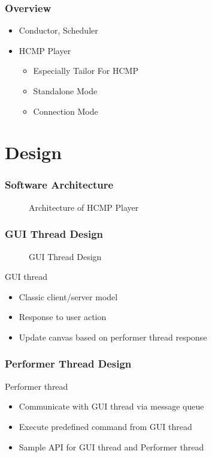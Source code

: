 \documentclass[t]{beamer}
\begin{document}
\begin{frame}
\frametitle{Overview}

  \begin{itemize}
    \item Conductor, Scheduler 
    \item HCMP Player 
        \begin{itemize}
          \item Especially Tailor For HCMP 
          \item Standalone Mode
          \item Connection Mode 
        \end{itemize}
  \end{itemize}
\end{frame}

\section{Design}

\begin{frame}
\frametitle{Software Architecture}
\begin{figure}[H] %
\caption{Architecture of HCMP Player}
\label{speciation}
\end{figure}
\end{frame}

\begin{frame}
\frametitle{GUI Thread Design}
\begin{figure}[H] %
\caption{GUI Thread Design}
\end{figure}
GUI thread 
  \begin{itemize}
    \item Classic client/server model
    \item Response to user action 
    \item Update canvas based on performer thread response  
  \end{itemize}

\end{frame}

\begin{frame}
\frametitle{Performer Thread Design}
Performer thread
  \begin{itemize}
    \item Communicate with GUI thread via message queue 
    \item Execute predefined command from GUI thread 
    \item Sample API for GUI thread and Performer thread
  \end{itemize}
  \begin{figure}[H] %
  \end{figure}
\end{frame}
\end{document}
